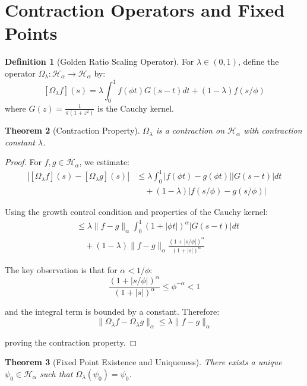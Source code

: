 \documentclass[12pt]{article}
\theoremstyle{plain}
\newtheorem{theorem}{Theorem}[section]
\theoremstyle{definition}
\newtheorem{definition}[theorem]{Definition}
\begin{document}
\section{Contraction Operators and Fixed Points}

\begin{definition}[Golden Ratio Scaling Operator]
For $\lambda \in (0,1)$, define the operator $\Omega_\lambda: \mathcal{H}_\alpha \to \mathcal{H}_\alpha$ by:
$$[\Omega_\lambda f](s) = \lambda \int_0^1 f(\phi t) G(s-t) dt + (1-\lambda) f(s/\phi)$$
where $G(z) = \frac{1}{\pi(1+z^2)}$ is the Cauchy kernel.
\end{definition}

\begin{theorem}[Contraction Property]
\label{thm:contraction}
$\Omega_\lambda$ is a contraction on $\mathcal{H}_\alpha$ with contraction constant $\lambda$.
\end{theorem}

\begin{proof}
For $f, g \in \mathcal{H}_\alpha$, we estimate:
\begin{align}
|[\Omega_\lambda f](s) - [\Omega_\lambda g](s)| &\leq \lambda \int_0^1 |f(\phi t) - g(\phi t)| |G(s-t)| dt\\
&\quad + (1-\lambda) |f(s/\phi) - g(s/\phi)|
\end{align}

Using the growth control condition and properties of the Cauchy kernel:
\begin{align}
&\leq \lambda \|f-g\|_\alpha \int_0^1 (1+|\phi t|)^\alpha |G(s-t)| dt\\
&\quad + (1-\lambda) \|f-g\|_\alpha \frac{(1+|s/\phi|)^\alpha}{(1+|s|)^\alpha}
\end{align}

The key observation is that for $\alpha < 1/\phi$:
$$\frac{(1+|s/\phi|)^\alpha}{(1+|s|)^\alpha} \leq \phi^{-\alpha} < 1$$

and the integral term is bounded by a constant. Therefore:
$$\|\Omega_\lambda f - \Omega_\lambda g\|_\alpha \leq \lambda \|f - g\|_\alpha$$

proving the contraction property.
\end{proof}

\begin{theorem}[Fixed Point Existence and Uniqueness]
\label{thm:fixed-point}
There exists a unique $\psi_0 \in \mathcal{H}_\alpha$ such that $\Omega_\lambda(\psi_0) = \psi_0$.
\end{theorem}
\end{document}

